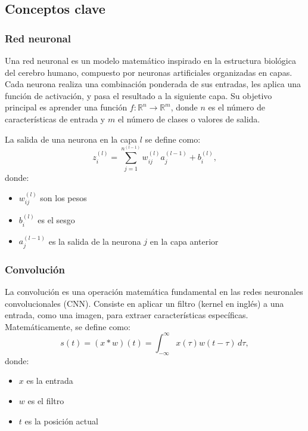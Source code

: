 \documentclass[../main.tex]{subfiles}
\begin{document}
\subsection{Conceptos clave}

\subsubsection{Red neuronal}

Una red neuronal es un modelo matemático inspirado en la estructura biológica del cerebro humano, compuesto por neuronas artificiales organizadas en capas. Cada neurona realiza una combinación ponderada de sus entradas, les aplica una función de activación, y pasa el resultado a la siguiente capa. Su objetivo principal es aprender una función \( f: \mathbb{R}^n \to \mathbb{R}^m \), donde \( n \) es el número de características de entrada y \( m \) el número de clases o valores de salida.

La salida de una neurona en la capa \( l \) se define como:
\[
z^{(l)}_i = \sum_{j=1}^{n^{(l-1)}} w^{(l)}_{ij} a^{(l-1)}_j + b^{(l)}_i,
\]
donde:

\begin{itemize}
    \item \( w^{(l)}_{ij} \) son los pesos
    \item \( b^{(l)}_i \) es el sesgo
    \item \( a^{(l-1)}_j \) es la salida de la neurona \( j \) en la capa anterior
\end{itemize}

\subsubsection{Convolución}

La convolución es una operación matemática fundamental en las redes neuronales convolucionales (CNN). Consiste en aplicar un filtro (kernel en inglés) a una entrada, como una imagen, para extraer características específicas. Matemáticamente, se define como:
\[
s(t) = (x * w)(t) = \int_{-\infty}^\infty x(\tau) w(t-\tau) \, d\tau,
\]
donde:

\begin{itemize}
    \item \( x \) es la entrada
    \item \( w \) es el filtro
    \item \( t \) es la posición actual
\end{itemize}
\end{document}
